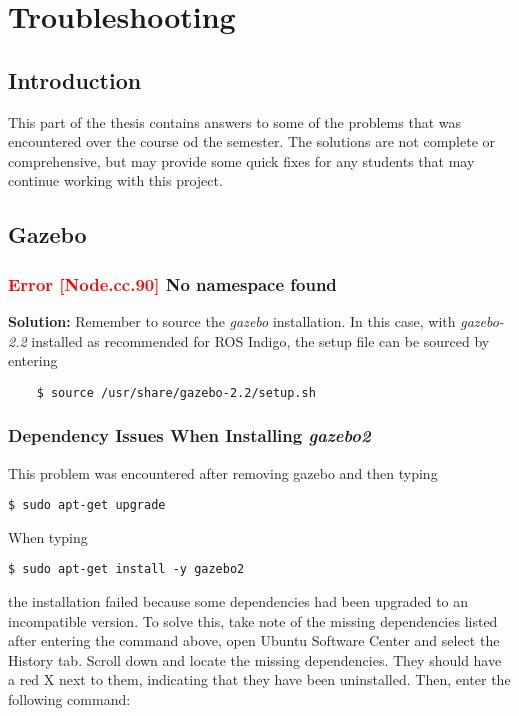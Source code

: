 \chapter{Troubleshooting}

\section{Introduction}

This part of the thesis contains answers to some of the problems that was encountered over the course od the semester. The solutions are not complete or comprehensive, but may provide some quick fixes for any students that may continue working with this project.

\section{Gazebo}

\subsection{\textcolor{red}{Error [Node.cc.90]} No namespace found}

\textbf{Solution: } Remember to source the \textit{gazebo} installation. In this case, with \textit{gazebo-2.2} installed as recommended for \ac{ROS} Indigo, the setup file can be sourced by entering

\begin{verbatim}
	$ source /usr/share/gazebo-2.2/setup.sh
\end{verbatim}

\subsection{Dependency Issues When Installing \textit{gazebo2}}

This problem was encountered after removing gazebo and then typing

\begin{verbatim}
$ sudo apt-get upgrade
\end{verbatim}

When typing 

\begin{verbatim}
$ sudo apt-get install -y gazebo2
\end{verbatim}

the installation failed because some dependencies had been upgraded to an incompatible version. To solve this, take note of the missing dependencies listed after entering the command above, open Ubuntu Software Center and select the History tab. Scroll down and locate the missing dependencies. They should have a red X next to them, indicating that they have been uninstalled. Then, enter the following command:

